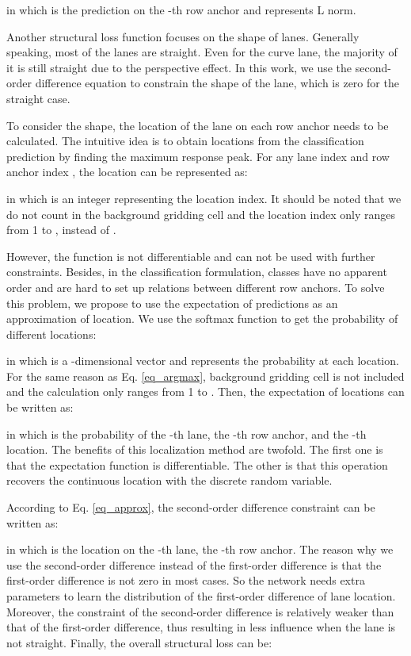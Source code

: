 \documentclass[runningheads]{llncs}
\begin{document}
in which  is the prediction on the -th row anchor and  represents L norm.

Another structural loss function focuses on the shape of lanes. Generally speaking, most of the lanes are straight. Even for the curve lane, the majority of it is still straight due to the perspective effect. In this work, we use the second-order difference equation to constrain the shape of the lane, which is zero for the straight case.

To consider the shape, the location of the lane on each row anchor needs to be calculated. The intuitive idea is to obtain locations from the classification prediction by finding the maximum response peak. For any lane index  and row anchor index , the location  can be represented as:

in which  is an integer representing the location index. It should be noted that we do not count in the background gridding cell and the location index  only ranges from 1 to , instead of . 

However, the  function is not differentiable and can not be used with further constraints. Besides, in the classification formulation, classes have no apparent order and are hard to set up relations between different row anchors. To solve this problem, we propose to use the expectation of predictions as an approximation of location. We use the softmax function to get the probability of different locations:

in which  is a -dimensional vector and  represents the probability at each location. For the same reason as Eq. \ref{eq_argmax}, background gridding cell is not included and the calculation only ranges from 1 to . Then, the expectation of locations can be written as: 


in which  is the probability of the -th lane, the -th row anchor, and the -th location. The benefits of this localization method are twofold. The first one is that the expectation function is differentiable. The other is that this operation recovers the continuous location with the discrete random variable.

According to Eq. \ref{eq_approx}, the second-order difference constraint can be written as:

in which  is the location on the -th lane, the -th row anchor.
The reason why we use the second-order difference instead of the first-order difference is that the first-order difference is not zero in most cases. So the network needs extra parameters to learn the distribution of the first-order difference of lane location. Moreover, the constraint of the second-order difference is relatively weaker than that of the first-order difference, thus resulting in less influence when the lane is not straight. Finally, the overall structural loss can be:
\end{document}
